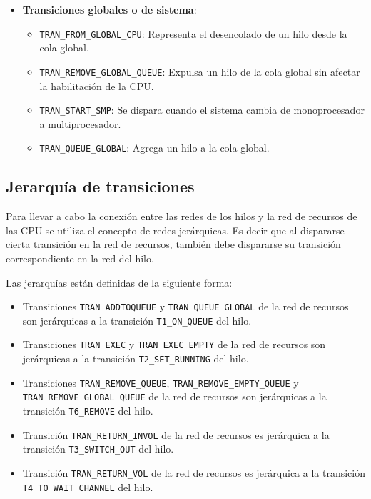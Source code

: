 \begin{itemize}
\begin{itemize}
            \item \verb|TRAN_THROW|: Esta transición se dispara automáticamente cuando todas las plazas de habilitación de las CPU tienen al menos un token. Su objetivo es habilitar las colas con la menor cantidad de hilos que estaban inhibidas, una vez que todas las colas se han nivelado.
        \end{itemize}
    \item \textbf{Transiciones globales o de sistema}:
        \begin{itemize}
            \item \verb|TRAN_FROM_GLOBAL_CPU|: Representa el desencolado de un hilo desde la cola global.
            \item \verb|TRAN_REMOVE_GLOBAL_QUEUE|: Expulsa un hilo de la cola global sin afectar la habilitación de la CPU.
            \item \verb|TRAN_START_SMP|: Se dispara cuando el sistema cambia de monoprocesador a multiprocesador.
            \item \verb|TRAN_QUEUE_GLOBAL|: Agrega un hilo a la cola global.
        \end{itemize}
    \end{itemize}


\subsection{Jerarquía de transiciones}
Para llevar a cabo la conexión entre las redes de los hilos y la red de recursos de las CPU se utiliza el concepto de redes jerárquicas. Es decir que al dispararse cierta transición en la red de recursos, también debe dispararse su transición correspondiente en la red del hilo.

Las jerarquías están definidas de la siguiente forma:

\begin{itemize}
    \item Transiciones \verb|TRAN_ADDTOQUEUE| y \verb|TRAN_QUEUE_GLOBAL| de la red de recursos son jerárquicas a la transición \verb|T1_ON_QUEUE| del hilo.
    \item Transiciones \verb|TRAN_EXEC| y \verb|TRAN_EXEC_EMPTY| de la red de recursos son jerárquicas a la transición \verb|T2_SET_RUNNING| del hilo.
    \item Transiciones \verb|TRAN_REMOVE_QUEUE|, \verb|TRAN_REMOVE_EMPTY_QUEUE| y \verb|TRAN_REMOVE_GLOBAL_QUEUE| de la red de recursos son jerárquicas a la transición \verb|T6_REMOVE| del hilo.
    \item Transición \verb|TRAN_RETURN_INVOL| de la red de recursos es jerárquica a la transición \verb|T3_SWITCH_OUT| del hilo.
    \item Transición \verb|TRAN_RETURN_VOL| de la red de recursos es jerárquica a la transición \verb|T4_TO_WAIT_CHANNEL| del hilo.
\end{itemize}

